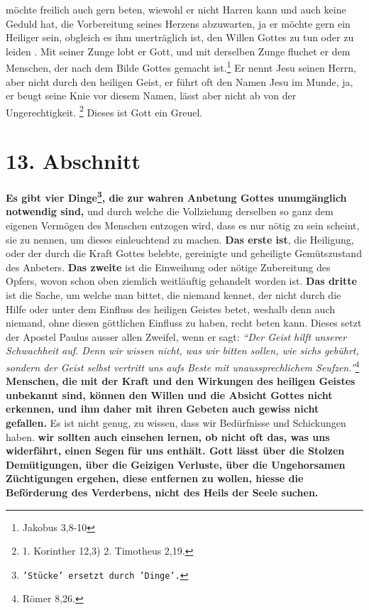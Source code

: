 möchte freilich auch
gern beten, wiewohl er nicht Harren kann und auch keine Geduld 
hat, die
Vorbereitung seines Herzens abzuwarten, ja er möchte gern ein Heiliger
 sein,
obgleich es ihm unerträglich ist, den Willen Gottes zu tun 
oder zu leiden . Mit
seiner Zunge lobt er Gott, und mit derselben Zunge fluchet er dem Menschen, der
nach dem Bilde Gottes gemacht ist.\footnote{Jakobus 3,8-10}
 Er nennt Jesu
seinen Herrn, aber nicht durch den heiligen Geist, er führt oft den Namen
Jesu im Munde, ja, er beugt seine Knie vor diesem Namen, lässt aber nicht ab
von der Ungerechtigkeit. 
\footnote{1. Korinther 12,3) 2. Timotheus 2,19.}
Dieses ist Gott ein Greuel.

\section{13. Abschnitt} \label{kap6_ab13}

\label{ref:06_13_vier_noetige_dinge}
 \textbf{Es gibt vier
Dinge\footnote{\texttt{'Stücke' ersetzt durch 'Dinge'.}}, die zur wahren Anbetung
Gottes
unumgänglich
notwendig
sind,} und durch welche die Vollziehung derselben so ganz dem eigenen Vermögen
des Menschen entzogen wird, dass es nur nötig zu sein scheint, sie zu nennen,
um dieses einleuchtend zu machen. \textbf{Das erste ist}, die Heiligung, oder
der durch
die Kraft Gottes belebte, gereinigte und geheiligte Gemütszustand des Anbeters.
\textbf{Das zweite} ist die Einweihung oder nötige Zubereitung des Opfers,
wovon schon
oben ziemlich weitläuftig gehandelt worden ist. \textbf{Das dritte} ist die
Sache, um
welche man bittet, die niemand kennet, der nicht durch die Hilfe oder unter dem
Einfluss des heiligen Geistes  betet, weshalb
denn auch
niemand, ohne diesen
göttlichen Einfluss zu haben, recht beten kann. Dieses setzt der Apostel
Paulus ausser allen Zweifel, wenn er sagt:
\textit{"`Der Geist hilft unserer
Schwachheit auf. Denn wir wissen nicht, was wir bitten sollen, wie sichs
gebührt, sondern der Geist selbst vertritt uns aufs Beste mit
unaussprechlichem Seufzen."'}\footnote{Römer 8,26.}
\textbf{Menschen, die mit der
Kraft
und den Wirkungen des heiligen Geistes unbekannt sind, können den Willen und die
Absicht Gottes nicht erkennen, und ihm daher mit ihren Gebeten auch gewiss
nicht gefallen.} Es ist nicht genug, zu wissen, dass wir Bedürfnisse und
Schickungen haben.  \textbf{wir sollten auch einsehen
lernen, ob nicht oft das,
was uns
widerfährt, einen Segen  für uns enthält. Gott lässt über die
Stolzen
Demütigungen, über die Geizigen Verluste, über die
Ungehorsamen Züchtigungen
ergehen, diese entfernen zu wollen, hiesse die Beförderung des Verderbens, nicht
des Heils der Seele suchen.}

